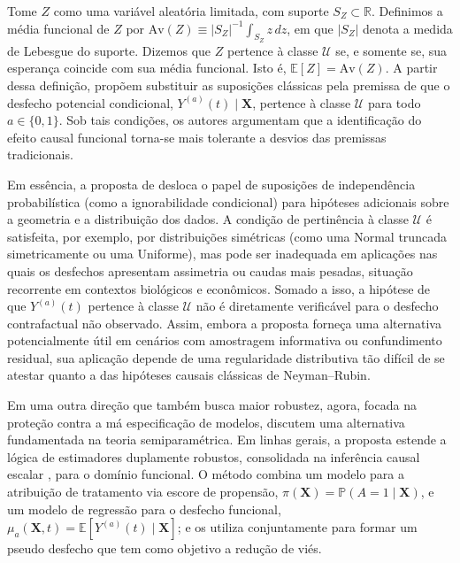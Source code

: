 Tome \(Z\) como uma variável aleatória limitada, com suporte \(S_Z \subset \mathbb{R}\). 
Definimos a média funcional de \(Z\) por \(\mathrm{Av}(Z) \equiv |S_Z|^{-1} \int_{S_Z} z \, dz\), em que \(|S_Z|\) denota a medida de Lebesgue do suporte. 
Dizemos que \(Z\) pertence à classe \(\mathcal{U}\) se, e somente se, sua esperança coincide com sua média funcional. 
Isto é, \(\mathbb{E}[Z] = \mathrm{Av}(Z)\). 
A partir dessa definição,  propõem substituir as suposições clássicas pela premissa de que o desfecho potencial condicional, \(Y^{(a)}(t) \mid \mathbf{X}\), pertence à classe \(\mathcal{U}\) para todo \(a \in \{0,1\}\). 
Sob tais condições, os autores argumentam que a identificação do efeito causal funcional torna-se mais tolerante a desvios das premissas tradicionais.

Em essência, a proposta de  desloca o papel de suposições de independência probabilística (como a ignorabilidade condicional) para hipóteses adicionais sobre a geometria e a distribuição dos dados. 
A condição de pertinência à classe \(\mathcal{U}\) é satisfeita, por exemplo, por distribuições simétricas (como uma Normal truncada simetricamente ou uma Uniforme), mas pode ser inadequada em aplicações nas quais os desfechos apresentam assimetria ou caudas mais pesadas, situação recorrente em contextos biológicos e econômicos. 
Somado a isso, a hipótese de que \(Y^{(a)}(t)\) pertence à classe \(\mathcal{U}\) não é diretamente verificável para o desfecho contrafactual não observado. 
Assim, embora a proposta forneça uma alternativa potencialmente útil em cenários com amostragem informativa ou confundimento residual, sua aplicação depende de uma regularidade distributiva tão difícil de se atestar quanto a das hipóteses causais clássicas de Neyman--Rubin.


Em uma outra direção que também busca maior robustez, agora, focada na proteção contra a má especificação de modelos,  discutem uma alternativa fundamentada na teoria semiparamétrica. 
Em linhas gerais, a proposta estende a lógica de estimadores duplamente robustos, consolidada na inferência causal escalar \cite{imbens_causal_2015}, para o domínio funcional. 
O método combina um modelo para a atribuição de tratamento via escore de propensão, \(\pi(\mathbf{X}) = \mathbb{P}(A = 1\mid \mathbf{X})\), e um modelo de regressão para o desfecho funcional, \(\mu_a(\mathbf{X}, t) = \mathbb{E}[Y^{(a)}(t)\mid \mathbf{X}]\); e os utiliza conjuntamente para formar um pseudo desfecho que tem como objetivo a redução de viés.

